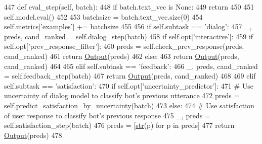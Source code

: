\begin{DoxyCode}
447     \textcolor{keyword}{def }eval\_step(self, batch):
448         \textcolor{keywordflow}{if} batch.text\_vec \textcolor{keywordflow}{is} \textcolor{keywordtype}{None}:
449             \textcolor{keywordflow}{return}
450 
451         self.model.eval()
452 
453         batchsize = batch.text\_vec.size(0)
454         self.metrics[\textcolor{stringliteral}{'examples'}] += batchsize
455 
456         \textcolor{keywordflow}{if} self.subtask == \textcolor{stringliteral}{'dialog'}:
457             \_, preds, cand\_ranked = self.dialog\_step(batch)
458             \textcolor{keywordflow}{if} self.opt[\textcolor{stringliteral}{'interactive'}]:
459                 \textcolor{keywordflow}{if} self.opt[\textcolor{stringliteral}{'prev\_response\_filter'}]:
460                     preds = self.check\_prev\_response(preds, cand\_ranked)
461                 \textcolor{keywordflow}{return} \hyperlink{namespaceparlai_1_1agents_1_1legacy__agents_1_1seq2seq_1_1torch__agent__v1_a2689006ea97d09413fb242f984bd8016}{Output}(preds)
462             \textcolor{keywordflow}{else}:
463                 \textcolor{keywordflow}{return} \hyperlink{namespaceparlai_1_1agents_1_1legacy__agents_1_1seq2seq_1_1torch__agent__v1_a2689006ea97d09413fb242f984bd8016}{Output}(preds, cand\_ranked)
464 
465         \textcolor{keywordflow}{elif} self.subtask == \textcolor{stringliteral}{'feedback'}:
466             \_, preds, cand\_ranked = self.feedback\_step(batch)
467             \textcolor{keywordflow}{return} \hyperlink{namespaceparlai_1_1agents_1_1legacy__agents_1_1seq2seq_1_1torch__agent__v1_a2689006ea97d09413fb242f984bd8016}{Output}(preds, cand\_ranked)
468 
469         \textcolor{keywordflow}{elif} self.subtask == \textcolor{stringliteral}{'satisfaction'}:
470             \textcolor{keywordflow}{if} self.opt[\textcolor{stringliteral}{'uncertainty\_predictor'}]:
471                 \textcolor{comment}{# Use uncertainty of dialog model to classify bot's previous utterance}
472                 preds = self.predict\_satisfaction\_by\_uncertainty(batch)
473             \textcolor{keywordflow}{else}:
474                 \textcolor{comment}{# Use satisfaction of user response to classify bot's previous response}
475                 \_, preds = self.satisfaction\_step(batch)
476             preds = [\hyperlink{namespacegenerate__task__READMEs_a5b88452ffb87b78c8c85ececebafc09f}{str}(p) \textcolor{keywordflow}{for} p \textcolor{keywordflow}{in} preds]
477             \textcolor{keywordflow}{return} \hyperlink{namespaceparlai_1_1agents_1_1legacy__agents_1_1seq2seq_1_1torch__agent__v1_a2689006ea97d09413fb242f984bd8016}{Output}(preds)
478 
\end{DoxyCode}
